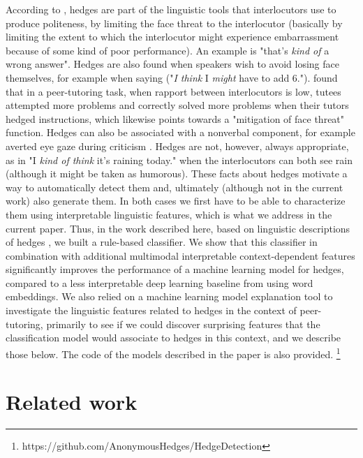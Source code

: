\documentclass[11pt]{article}
\begin{document}
According to \citet{Brown1987}, hedges are part of the linguistic tools that interlocutors use to produce politeness, by limiting the face threat to the interlocutor (basically by limiting the extent to which the interlocutor might experience embarrassment because of some kind of poor performance). An example is "that's \textit{kind of} a wrong answer". Hedges are also found when speakers wish to avoid losing face themselves, for example when saying ("\textit{I think} I \textit{might} have to add 6."). \citet{Madaio2017} found that in a peer-tutoring task, when rapport between interlocutors is low, tutees attempted more problems and correctly solved more problems when their tutors hedged instructions, which likewise points towards a "mitigation of face threat" function.
\noindent Hedges can also be associated with a nonverbal component, for example averted eye gaze during criticism \cite{Burgoon1984}. Hedges are not, however, always appropriate, as in "I \textit{kind of think} it's raining today." when the interlocutors can both see rain (although it might be taken as humorous). These facts about hedges motivate a way to automatically detect them and, ultimately (although not in the current work) also generate them. In both cases we first have to be able to characterize them using interpretable linguistic features, which is what we address in the current paper. 
Thus, in the work described here, based on linguistic descriptions of hedges \citep{Brown1987, Fraser2010}, we built a rule-based classifier. We show that this classifier in combination with additional multimodal interpretable context-dependent features significantly improves the performance of a machine learning model for hedges, compared to a less interpretable deep learning baseline from \citet{Goel2019} using word embeddings. We also relied on a machine learning model explanation tool \cite{Lundberg2017} to investigate the linguistic features related to hedges in the context of peer-tutoring, primarily to see if we could discover surprising features that the classification model would associate to hedges in this context, and we describe those below. The code of the models described in the paper is also provided. \footnote{https://github.com/AnonymousHedges/HedgeDetection}

\section{Related work}
\end{document}
